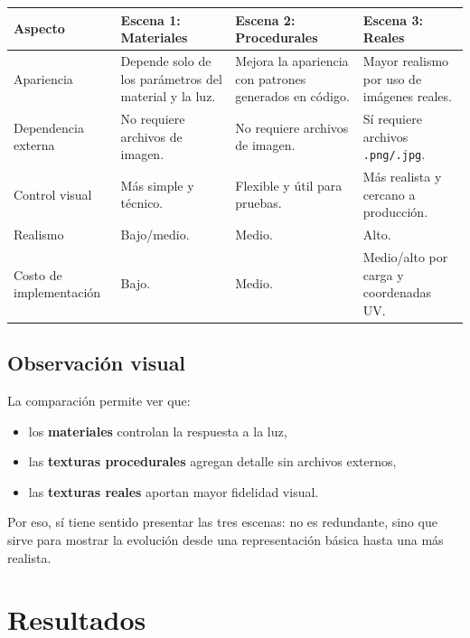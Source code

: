 \documentclass[12pt,a4paper]{article}
\begin{document}
\begin{center}
\begin{tabular}{p{2.5cm} p{4.2cm} p{4.2cm} p{4.2cm}}
\toprule
\textbf{Aspecto} & \textbf{Escena 1: Materiales} & \textbf{Escena 2: Procedurales} & \textbf{Escena 3: Reales} \\
\midrule
Apariencia & Depende solo de los parámetros del material y la luz. & Mejora la apariencia con patrones generados en código. & Mayor realismo por uso de imágenes reales. \\
Dependencia externa & No requiere archivos de imagen. & No requiere archivos de imagen. & Sí requiere archivos \texttt{.png/.jpg}. \\
Control visual & Más simple y técnico. & Flexible y útil para pruebas. & Más realista y cercano a producción. \\
Realismo & Bajo/medio. & Medio. & Alto. \\
Costo de implementación & Bajo. & Medio. & Medio/alto por carga y coordenadas UV. \\
\bottomrule
\end{tabular}
\end{center}

\subsection{Observación visual}

La comparación permite ver que:

\begin{itemize}
  \item los \textbf{materiales} controlan la respuesta a la luz,
  \item las \textbf{texturas procedurales} agregan detalle sin archivos externos,
  \item las \textbf{texturas reales} aportan mayor fidelidad visual.
\end{itemize}

Por eso, sí tiene sentido presentar las tres escenas: no es redundante, sino que
sirve para mostrar la evolución desde una representación básica hasta una más
realista.

\section{Resultados}
\end{document}
